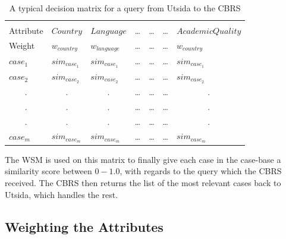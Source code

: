\begin{table}[h]
\centering
\caption{A typical decision matrix for a query from Utsida to the CBRS}
\label{tab:decision_matrix}
\begin{tabular}{lllcccl}
                      &                       &                       & \multicolumn{1}{l}{} & \multicolumn{1}{l}{} & \multicolumn{1}{l}{} &                       \\
Attribute             & $Country$             & $Language$            & \ldots               & \ldots               & \ldots               & $AcademicQuality$     \\\hline
Weight                & $w_{country}$         & $w_{language}$        & \ldots               & \ldots               & \ldots               & $w_{country}$         \\\hline
$case_{1}$            & $sim_{case_{1}}$      & $sim_{case_{1}}$      & \ldots               & \ldots               & \ldots               & $sim_{case_{1}}$      \\
$case_{2}$            & $sim_{case_{2}}$      & $sim_{case_{2}}$      & \ldots               & \ldots               & \ldots               & $sim_{case_{2}}$      \\
\multicolumn{1}{c}{.} & \multicolumn{1}{c}{.} & \multicolumn{1}{c}{.} & \ldots               & \ldots               & \ldots               & \multicolumn{1}{c}{.} \\
\multicolumn{1}{c}{.} & \multicolumn{1}{c}{.} & \multicolumn{1}{c}{.} & \ldots               & \ldots               & \ldots               & \multicolumn{1}{c}{.} \\
\multicolumn{1}{c}{.} & \multicolumn{1}{c}{.} & \multicolumn{1}{c}{.} & \ldots               & \ldots               & \ldots               & \multicolumn{1}{c}{.} \\
$case_{m}$            & $sim_{case_{m}}$      & $sim_{case_{m}}$      & \ldots               & \ldots               & \ldots               & $sim_{case_{m}}$     
\end{tabular}
\end{table}

The WSM is used on this matrix to finally give each case in the case-base a similarity score between $0-1.0$, with regards to the query which the CBRS received. The CBRS then returns the list of the most relevant cases back to Utsida, which handles the rest.


\subsection{Weighting the Attributes}\label{sec:weighting}

